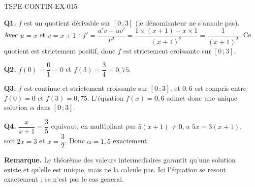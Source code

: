 \begin{corrige}{TSPE-CONTIN-EX-015}

\textbf{Q1.} $f$ est un quotient dérivable sur $[0\,;3]$ (le dénominateur ne s'annule pas). Avec $u = x$ et $v = x+1$ : $f' = \dfrac{u'v - uv'}{v^2} = \dfrac{1\times(x+1) - x\times 1}{(x+1)^2} = \dfrac{1}{(x+1)^2}$. Ce quotient est strictement positif, donc $f$ est strictement croissante sur $[0\,;3]$.

\textbf{Q2.} $f(0) = \dfrac{0}{1} = 0$ et $f(3) = \dfrac{3}{4} = 0{,}75$.

\textbf{Q3.} $f$ est continue et strictement croissante sur $[0\,;3]$, et $0{,}6$ est compris entre $f(0) = 0$ et $f(3) = 0{,}75$. L'équation $f(x) = 0{,}6$ admet donc une unique solution $\alpha$ dans $[0\,;3]$.

\textbf{Q4.} $\dfrac{x}{x+1} = \dfrac{3}{5}$ equivaut, en multipliant par $5(x+1)
\neq 0$, a $5x = 3(x+1)$, soit $2x = 3$ et $x = \dfrac{3}{2}$. Donc $\alpha = 1{,}5$ exactement.

\textbf{Remarque.} Le théorème des valeurs intermediaires garantit qu'une solution existe et qu'elle est unique, mais ne la calcule pas. Ici l'équation se resout exactement ; ce n'est pas le cas general.
\end{corrige}
